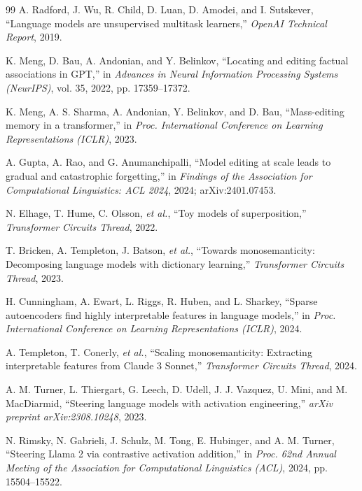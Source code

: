 ﻿\clearpage
{}
\renewcommand{\bibname}{References}
\begingroup\singlespacing\footnotesize
\begin{thebibliography}{99}
 A. Radford, J. Wu, R. Child, D. Luan, D. Amodei, and I. Sutskever, ``Language models are unsupervised multitask learners,'' \textit{OpenAI Technical Report}, 2019.

 K. Meng, D. Bau, A. Andonian, and Y. Belinkov, ``Locating and editing factual associations in GPT,'' in \textit{Advances in Neural Information Processing Systems (NeurIPS)}, vol. 35, 2022, pp. 17359--17372.

 K. Meng, A. S. Sharma, A. Andonian, Y. Belinkov, and D. Bau, ``Mass-editing memory in a transformer,'' in \textit{Proc. International Conference on Learning Representations (ICLR)}, 2023.

 A. Gupta, A. Rao, and G. Anumanchipalli, ``Model editing at scale leads to gradual and catastrophic forgetting,'' in \textit{Findings of the Association for Computational Linguistics: ACL 2024}, 2024; arXiv:2401.07453.

 N. Elhage, T. Hume, C. Olsson, \textit{et al.}, ``Toy models of superposition,'' \textit{Transformer Circuits Thread}, 2022.

 T. Bricken, A. Templeton, J. Batson, \textit{et al.}, ``Towards monosemanticity: Decomposing language models with dictionary learning,'' \textit{Transformer Circuits Thread}, 2023.

 H. Cunningham, A. Ewart, L. Riggs, R. Huben, and L. Sharkey, ``Sparse autoencoders find highly interpretable features in language models,'' in \textit{Proc. International Conference on Learning Representations (ICLR)}, 2024.

 A. Templeton, T. Conerly, \textit{et al.}, ``Scaling monosemanticity: Extracting interpretable features from Claude 3 Sonnet,'' \textit{Transformer Circuits Thread}, 2024.

 A. M. Turner, L. Thiergart, G. Leech, D. Udell, J. J. Vazquez, U. Mini, and M. MacDiarmid, ``Steering language models with activation engineering,'' \textit{arXiv preprint arXiv:2308.10248}, 2023.

 N. Rimsky, N. Gabrieli, J. Schulz, M. Tong, E. Hubinger, and A. M. Turner, ``Steering Llama 2 via contrastive activation addition,'' in \textit{Proc. 62nd Annual Meeting of the Association for Computational Linguistics (ACL)}, 2024, pp. 15504--15522.


\end{thebibliography}
